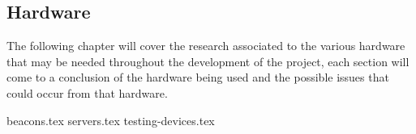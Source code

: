 \subsection{Hardware}
The following chapter will cover the research associated to the various hardware that may be needed throughout the development of the project, each section will come to a conclusion of the hardware being used and the possible issues that could occur from that hardware.

{beacons.tex}
{servers.tex}
{testing-devices.tex}